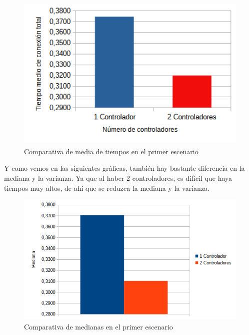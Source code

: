 \documentclass[a4paper, 12pt]{book}
\begin{document}
 	\begin{figure}[H]
 		\centering
 		\includegraphics[width=12cm, keepaspectratio]{img/comparativamediasbucle}
 		\caption{Comparativa de media de tiempos en el primer escenario}
 		\label{figura:mediabucle4}
 	\end{figure}
 	
 	
 	Y como vemos en las siguientes gráficas, también hay bastante diferencia en la mediana y la varianza. Ya que al haber 2 controladores, es difícil que haya tiempos muy altos, de ahí que se reduzca la mediana y la varianza.
 	
 	\begin{figure}[H]
 		\centering
 		\includegraphics[width=12cm, keepaspectratio]{img/comparativamedianabucle}
 		\caption{Comparativa de medianas en el primer escenario}
 		\label{figura:medianabucle4}
 	\end{figure}
 	
\end{document}
